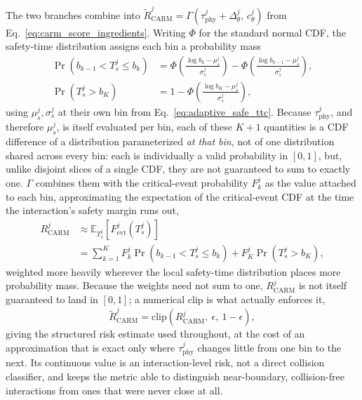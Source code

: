 \documentclass[letterpaper, 10 pt, conference]{ieeeconf}  %
\begin{document}
The two branches combine into
$\widetilde R_{\mathrm{CARM}}^{j}=\Gamma(\tau_{\mathrm{phy}}^{j}+\Delta_\theta^j,\,c_\theta^j)$
from Eq.~\eqref{eq:carm_score_ingredients}. Writing $\Phi$ for the
standard normal CDF, the safety-time distribution assigns each bin a
probability mass
\begin{equation}
\begin{aligned}
\Pr(b_{k-1}<T_s^j\le b_k) &= \Phi\!\left(\tfrac{\log b_k-\mu_s^j}{\sigma_s^j}\right)-\Phi\!\left(\tfrac{\log b_{k-1}-\mu_s^j}{\sigma_s^j}\right), \\
\Pr(T_s^j> b_K) &= 1-\Phi\!\left(\tfrac{\log b_K-\mu_s^j}{\sigma_s^j}\right),
\end{aligned}
\end{equation}
using $\mu_s^{j},\sigma_s^{j}$ at their own bin from
Eq.~\eqref{eq:adaptive_safe_ttc}. Because $\tau_{\mathrm{phy}}^j$, and
therefore $\mu_s^j$, is itself evaluated per bin, each of these $K+1$
quantities is a CDF difference of a distribution parameterized
\emph{at that bin}, not of one distribution shared across every bin:
each is individually a valid probability in $[0,1]$, but, unlike disjoint
slices of a single CDF, they are not guaranteed to sum to exactly one.
$\Gamma$ combines them with the critical-event probability $F_k^j$ as the
value attached to each bin, approximating the expectation of the
critical-event CDF at the time the interaction's safety margin runs out,
\begin{align}
R_{\mathrm{CARM}}^{j}
&\approx\mathbb E_{T_s^j}\!\left[F_{\mathrm{evt}}^{j}(T_s^j)\right]
\nonumber\\
&=\sum_{k=1}^{K}F_k^j\Pr(b_{k-1}<T_s^j\le b_k)
+F_K^j\Pr(T_s^j> b_K),
\label{eq:carm_composition}
\end{align}
weighted more heavily wherever the local safety-time distribution places
more probability mass. Because the weights need not sum to one,
$R_{\mathrm{CARM}}^{j}$ is not itself guaranteed to land in $[0,1]$; a
numerical clip is what actually enforces it,
\begin{equation}
\widetilde R_{\mathrm{CARM}}^{j}=\mathrm{clip}\!\left(R_{\mathrm{CARM}}^{j},\ \epsilon,\ 1-\epsilon\right),
\label{eq:carm_clip}
\end{equation}
giving the structured risk estimate used throughout, at the cost of an
approximation that is exact only where $\tau_{\mathrm{phy}}^j$ changes
little from one bin to the next. Its continuous value is an
interaction-level risk, not a direct collision classifier, and keeps the
metric able to distinguish near-boundary, collision-free interactions
from ones that were never close at all.
\end{document}
